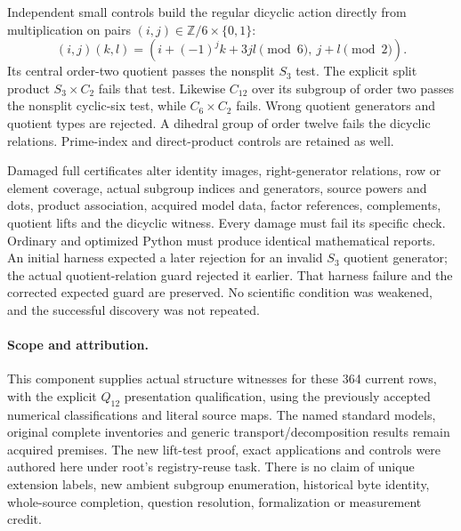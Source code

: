 \documentclass[11pt]{article}
\begin{document}
Independent small controls build the regular dicyclic action directly
from multiplication on pairs $(i,j)\in\mathbb Z/6\times\{0,1\}$:
\[
(i,j)(k,l)=(i+(-1)^jk+3jl\pmod6,\ j+l\pmod2).
\]
Its central order-two quotient passes the nonsplit $S_3$ test.
The explicit split product $S_3\times C_2$ fails that test. Likewise
$C_{12}$ over its subgroup of order two passes the nonsplit cyclic-six
test, while $C_6\times C_2$ fails. Wrong quotient generators and quotient
types are rejected. A dihedral group of order twelve fails the dicyclic
relations. Prime-index and direct-product controls are retained as well.

Damaged full certificates alter identity images, right-generator
relations, row or element coverage, actual subgroup indices and generators,
source powers and dots, product association, acquired model data, factor
references, complements, quotient lifts and the dicyclic witness. Every
damage must fail its specific check. Ordinary and optimized Python must
produce identical mathematical reports. An initial harness expected a
later rejection for an invalid $S_3$ quotient generator; the actual
quotient-relation guard rejected it earlier. That harness failure and the
corrected expected guard are preserved. No scientific condition was
weakened, and the successful discovery was not repeated.

\paragraph{Scope and attribution.}
This component supplies actual structure witnesses for these 364 current
rows, with the explicit $Q_{12}$ presentation qualification, using the
previously accepted numerical classifications and literal source maps.
The named standard models, original complete inventories and generic
transport/decomposition results remain acquired premises. The new
lift-test proof, exact applications and controls were authored here under
root's registry-reuse task. There is no claim of unique extension labels,
new ambient subgroup enumeration, historical byte identity, whole-source
completion, question resolution, formalization or measurement credit.
\end{document}
